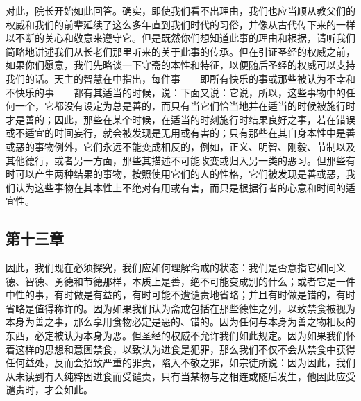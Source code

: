 \par

对此，院长开始如此回答。确实，即使我们看不出理由，我们也应当顺从教父们的权威和我们的前辈延续了这么多年直到我们时代的习俗，并像从古代传下来的一样以不断的关心和敬意来遵守它。但是既然你们想知道此事的理由和根据，请听我们简略地讲述我们从长老们那里听来的关于此事的传承。但在引证圣经的权威之前，如果你们愿意，我们先略谈一下守斋的本性和特征，以便随后圣经的权威可以支持我们的话。天主的智慧在中指出，每件事——即所有快乐的事或那些被认为不幸和不快乐的事——都有其适当的时候，说：下面又说：它说，所以，这些事物中的任何一个，它都没有设定为总是善的，而只有当它们恰当地并在适当的时候被施行时才是善的；因此，那些在某个时候，在适当的时刻施行时结果良好之事，若在错误或不适宜的时间妄行，就会被发现是无用或有害的；只有那些在其自身本性中是善或恶的事物例外，它们永远不能变成相反的，例如，正义、明智、刚毅、节制以及其他德行，或者另一方面，那些其描述不可能改变或归入另一类的恶习。但那些有时可以产生两种结果的事物，按照使用它们的人的性格，它们被发现是善或恶，我们认为这些事物在其本性上不绝对有用或有害，而只是根据行者的心意和时间的适宜性。\par


\subsection{第十三章}

\par

因此，我们现在必须探究，我们应如何理解斋戒的状态：我们是否意指它如同义德、智德、勇德和节德那样，本质上是善，绝不可能变成别的什么；或者它是一件中性的事，有时做是有益的，有时可能不遭谴责地省略；并且有时做是错的，有时省略是值得称许的。因为如果我们认为斋戒包括在那些德性之列，以致禁食被视为本身为善之事，那么享用食物必定是恶的、错的。因为任何与本身为善之物相反的东西，必定被认为本身为恶。但圣经的权威不允许我们如此规定。因为如果我们怀着这样的思想和意图禁食，以致认为进食是犯罪，那么我们不仅不会从禁食中获得任何益处，反而会招致严重的罪责，陷入不敬之罪，如宗徒所说：因为因此，我们从未读到有人纯粹因进食而受谴责，只有当某物与之相连或随后发生，他因此应受谴责时，才会如此。\par

